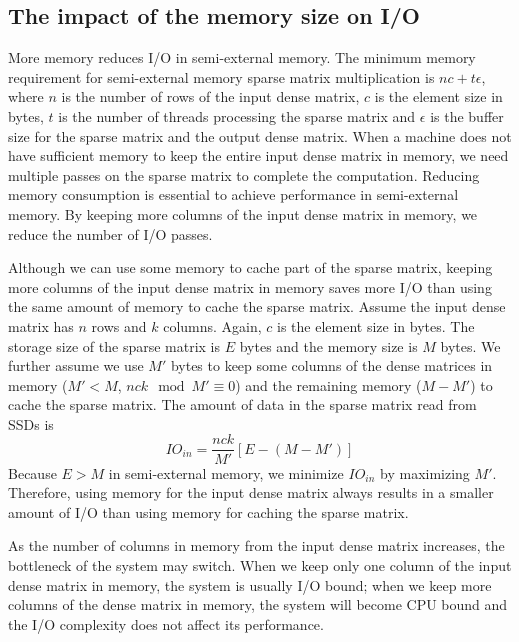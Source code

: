 \subsection{The impact of the memory size on I/O}
\label{sec:spmm:mem}
More memory reduces I/O in semi-external memory.
The minimum memory requirement for semi-external memory sparse matrix
multiplication is $n c + t \epsilon$, where $n$ is the number of rows
of the input dense matrix, $c$ is the element size in bytes,
$t$ is the number of threads processing the sparse matrix
and $\epsilon$ is the buffer size for the sparse matrix and the output
dense matrix. When a machine does not have sufficient memory to keep the entire
input dense matrix in memory, we need multiple passes on the sparse matrix to
complete the computation. Reducing memory consumption is essential
to achieve performance in semi-external memory. By keeping more columns of
the input dense matrix in memory, we reduce the number of I/O passes.

Although we can use some memory to cache part of the sparse matrix,
keeping more columns of the input dense matrix in memory saves more I/O than
using the same amount of memory to cache the sparse matrix. Assume the input
dense matrix has $n$ rows and $k$ columns. Again, $c$ is the element size
in bytes. The storage size of the sparse
matrix is $E$ bytes and the memory size is $M$ bytes. We further assume
we use $M'$ bytes to keep some columns of the dense matrices in memory
($M' < M$, ${n c k} \mod {M'} \equiv 0$)
and the remaining memory ($M - M'$) to cache the sparse matrix.
The amount of data in the sparse matrix read from SSDs is
\begin{equation*}
IO_{in} = \frac{n c k}{M'} [E - (M - M')]
\end{equation*}
Because $E > M$ in semi-external memory, we minimize $IO_{in}$ by maximizing $M'$.
Therefore, using memory for the input dense matrix always results in a smaller
amount of I/O than using memory for caching the sparse matrix.

As the number of columns in memory from the input dense matrix increases,
the bottleneck of the system
may switch. When we keep only one column of the input dense matrix in memory,
the system is usually I/O bound; when we keep more columns of the dense matrix
in memory, the system will become CPU bound and the I/O complexity does not
affect its performance.


